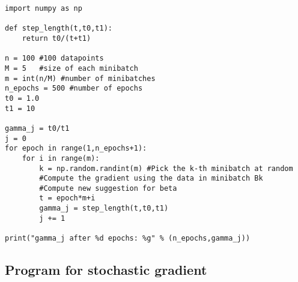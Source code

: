 \documentclass[%
oneside,                 %
final,                   %
10pt]{article}
\begin{document}
\begin{verbatim}
import numpy as np 

def step_length(t,t0,t1):
    return t0/(t+t1)

n = 100 #100 datapoints 
M = 5   #size of each minibatch
m = int(n/M) #number of minibatches
n_epochs = 500 #number of epochs
t0 = 1.0
t1 = 10

gamma_j = t0/t1
j = 0
for epoch in range(1,n_epochs+1):
    for i in range(m):
        k = np.random.randint(m) #Pick the k-th minibatch at random
        #Compute the gradient using the data in minibatch Bk
        #Compute new suggestion for beta
        t = epoch*m+i
        gamma_j = step_length(t,t0,t1)
        j += 1

print("gamma_j after %d epochs: %g" % (n_epochs,gamma_j))

\end{verbatim}


\subsection*{Program for stochastic gradient}
\end{document}
